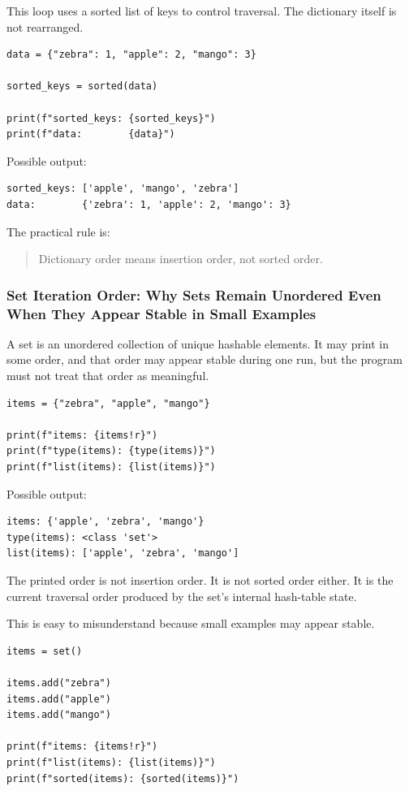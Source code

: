 This loop uses a sorted list of keys to control traversal. The dictionary itself is not rearranged.

\begin{verbatim}
data = {"zebra": 1, "apple": 2, "mango": 3}

sorted_keys = sorted(data)

print(f"sorted_keys: {sorted_keys}")
print(f"data:        {data}")
\end{verbatim}

Possible output:

\begin{verbatim}
sorted_keys: ['apple', 'mango', 'zebra']
data:        {'zebra': 1, 'apple': 2, 'mango': 3}
\end{verbatim}

The practical rule is:

\begin{quote}
Dictionary order means insertion order, not sorted order.
\end{quote}

\subsubsection{Set Iteration Order: Why Sets Remain Unordered Even When They Appear Stable in Small Examples}

A set is an unordered collection of unique hashable elements. It may print in some order, and that order may appear stable during one run, but the program must not treat that order as meaningful.

\begin{verbatim}
items = {"zebra", "apple", "mango"}

print(f"items: {items!r}")
print(f"type(items): {type(items)}")
print(f"list(items): {list(items)}")
\end{verbatim}

Possible output:

\begin{verbatim}
items: {'apple', 'zebra', 'mango'}
type(items): <class 'set'>
list(items): ['apple', 'zebra', 'mango']
\end{verbatim}

The printed order is not insertion order. It is not sorted order either. It is the current traversal order produced by the set's internal hash-table state.

This is easy to misunderstand because small examples may appear stable.

\begin{verbatim}
items = set()

items.add("zebra")
items.add("apple")
items.add("mango")

print(f"items: {items!r}")
print(f"list(items): {list(items)}")
print(f"sorted(items): {sorted(items)}")
\end{verbatim}

